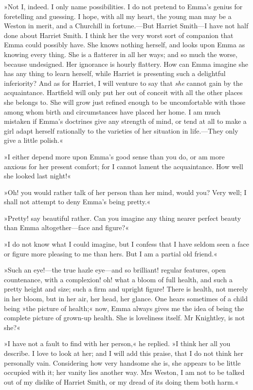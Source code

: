 »Not I, indeed. I only name possibilities. I do not pretend to Emma's genius for foretelling and guessing. I hope, with all my heart, the young man may be a Weston in merit, and a Churchill in fortune.—But Harriet Smith—I have not half done about Harriet Smith. I think her the very worst sort of companion that Emma could possibly have. She knows nothing herself, and looks upon Emma as knowing every thing. She is a flatterer in all her ways; and so much the worse, because undesigned. Her ignorance is hourly flattery. How can Emma imagine she has any thing to learn herself, while Harriet is presenting such a delightful inferiority? And as for Harriet, I will venture to say that \textit{she} cannot gain by the acquaintance. Hartfield will only put her out of conceit with all the other places she belongs to. She will grow just refined enough to be uncomfortable with those among whom birth and circumstances have placed her home. I am much mistaken if Emma's doctrines give any strength of mind, or tend at all to make a girl adapt herself rationally to the varieties of her situation in life.—They only give a little polish.«

»I either depend more upon Emma's good sense than you do, or am more anxious for her present comfort; for I cannot lament the acquaintance. How well she looked last night!«

»Oh! you would rather talk of her person than her mind, would you? Very well; I shall not attempt to deny Emma's being pretty.«

»Pretty! say beautiful rather. Can you imagine any thing nearer perfect beauty than Emma altogether—face and figure?«

»I do not know what I could imagine, but I confess that I have seldom seen a face or figure more pleasing to me than hers. But I am a partial old friend.«

»Such an eye!—the true hazle eye—and so brilliant! regular features, open countenance, with a complexion! oh! what a bloom of full health, and such a pretty height and size; such a firm and upright figure! There is health, not merely in her bloom, but in her air, her head, her glance. One hears sometimes of a child being »the picture of health;« now, Emma always gives me the idea of being the complete picture of grown-up health. She is loveliness itself. Mr Knightley, is not she?«

»I have not a fault to find with her person,« he replied. »I think her all you describe. I love to look at her; and I will add this praise, that I do not think her personally vain. Considering how very handsome she is, she appears to be little occupied with it; her vanity lies another way. Mrs Weston, I am not to be talked out of my dislike of Harriet Smith, or my dread of its doing them both harm.«

